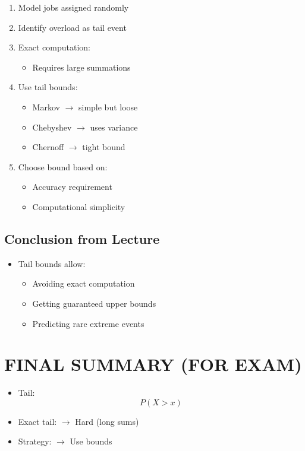 \documentclass[11pt]{article}
\begin{document}
\begin{enumerate}
\item Model jobs assigned randomly
\item Identify overload as tail event
\item Exact computation:
\begin{itemize}
\item Requires large summations
\end{itemize}
\item Use tail bounds:
\begin{itemize}
\item Markov $\rightarrow$ simple but loose
\item Chebyshev $\rightarrow$ uses variance
\item Chernoff $\rightarrow$ tight bound
\end{itemize}
\item Choose bound based on:
\begin{itemize}
\item Accuracy requirement
\item Computational simplicity
\end{itemize}
\end{enumerate}

\subsection*{Conclusion from Lecture}

\begin{itemize}
\item Tail bounds allow:
\begin{itemize}
\item Avoiding exact computation
\item Getting guaranteed upper bounds
\item Predicting rare extreme events
\end{itemize}
\end{itemize}

\section*{FINAL SUMMARY (FOR EXAM)}

\begin{itemize}
\item Tail:
\[
P(X > x)
\]
\item Exact tail:
$\rightarrow$ Hard (long sums)

\item Strategy:
$\rightarrow$ Use bounds
\end{itemize}
\end{document}
